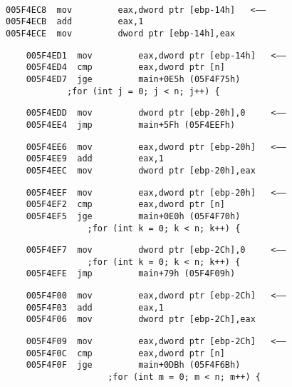 \begin{lstlisting}

005F4EC8  mov         eax,dword ptr [ebp-14h]   <——
005F4ECB  add         eax,1  
005F4ECE  mov         dword ptr [ebp-14h],eax  

\end{lstlisting}

\begin{lstlisting}
    005F4ED1  mov         eax,dword ptr [ebp-14h]   <——
    005F4ED4  cmp         eax,dword ptr [n]  
    005F4ED7  jge         main+0E5h (05F4F75h)  
            ;for (int j = 0; j < n; j++) {
\end{lstlisting}

\begin{lstlisting}
    005F4EDD  mov         dword ptr [ebp-20h],0     <——
    005F4EE4  jmp         main+5Fh (05F4EEFh)  
\end{lstlisting}

\begin{lstlisting}
    005F4EE6  mov         eax,dword ptr [ebp-20h]   <——
    005F4EE9  add         eax,1  
    005F4EEC  mov         dword ptr [ebp-20h],eax 
\end{lstlisting}

\begin{lstlisting}
    005F4EEF  mov         eax,dword ptr [ebp-20h]   <——
    005F4EF2  cmp         eax,dword ptr [n]  
    005F4EF5  jge         main+0E0h (05F4F70h)  
                ;for (int k = 0; k < n; k++) {
\end{lstlisting}

\begin{lstlisting}
    005F4EF7  mov         dword ptr [ebp-2Ch],0     <——
                ;for (int k = 0; k < n; k++) {
    005F4EFE  jmp         main+79h (05F4F09h)  
\end{lstlisting}

\begin{lstlisting}
    005F4F00  mov         eax,dword ptr [ebp-2Ch]   <——
    005F4F03  add         eax,1  
    005F4F06  mov         dword ptr [ebp-2Ch],eax  
\end{lstlisting}

\begin{lstlisting}
    005F4F09  mov         eax,dword ptr [ebp-2Ch]   <——
    005F4F0C  cmp         eax,dword ptr [n]  
    005F4F0F  jge         main+0DBh (05F4F6Bh)  
                    ;for (int m = 0; m < n; m++) {
\end{lstlisting}

